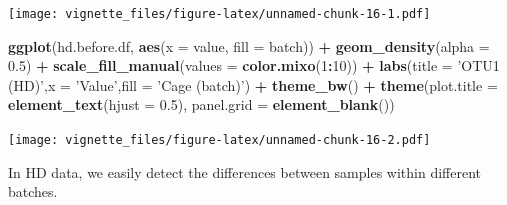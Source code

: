 \documentclass[]{book}
\newenvironment{Shaded}{\begin{snugshade}}{\end{snugshade}}
\newcommand{\KeywordTok}[1]{\textcolor[rgb]{0.13,0.29,0.53}{\textbf{#1}}}
\newcommand{\DataTypeTok}[1]{\textcolor[rgb]{0.13,0.29,0.53}{#1}}
\newcommand{\DecValTok}[1]{\textcolor[rgb]{0.00,0.00,0.81}{#1}}
\newcommand{\FloatTok}[1]{\textcolor[rgb]{0.00,0.00,0.81}{#1}}
\newcommand{\StringTok}[1]{\textcolor[rgb]{0.31,0.60,0.02}{#1}}
\newcommand{\CommentTok}[1]{\textcolor[rgb]{0.56,0.35,0.01}{\textit{#1}}}
\newcommand{\OperatorTok}[1]{\textcolor[rgb]{0.81,0.36,0.00}{\textbf{#1}}}
\newcommand{\NormalTok}[1]{#1}
\begin{document}
\begin{Shaded}
\end{Shaded}

\texttt{[image: vignette\_files/figure-latex/unnamed-chunk-16-1.pdf]}

\begin{Shaded}
\begin{Highlighting}[]
\KeywordTok{ggplot}\NormalTok{(hd.before.df, }\KeywordTok{aes}\NormalTok{(}\DataTypeTok{x =}\NormalTok{ value, }\DataTypeTok{fill =}\NormalTok{ batch)) }\OperatorTok{+}\StringTok{ }
\StringTok{  }\KeywordTok{geom_density}\NormalTok{(}\DataTypeTok{alpha =} \FloatTok{0.5}\NormalTok{) }\OperatorTok{+}\StringTok{ }\KeywordTok{scale_fill_manual}\NormalTok{(}\DataTypeTok{values =} \KeywordTok{color.mixo}\NormalTok{(}\DecValTok{1}\OperatorTok{:}\DecValTok{10}\NormalTok{)) }\OperatorTok{+}\StringTok{ }
\StringTok{  }\KeywordTok{labs}\NormalTok{(}\DataTypeTok{title =} \StringTok{'OTU1 (HD)'}\NormalTok{,}\DataTypeTok{x =} \StringTok{'Value'}\NormalTok{,}\DataTypeTok{fill =} \StringTok{'Cage (batch)'}\NormalTok{) }\OperatorTok{+}\StringTok{ }
\StringTok{  }\KeywordTok{theme_bw}\NormalTok{() }\OperatorTok{+}\StringTok{ }\KeywordTok{theme}\NormalTok{(}\DataTypeTok{plot.title =} \KeywordTok{element_text}\NormalTok{(}\DataTypeTok{hjust =} \FloatTok{0.5}\NormalTok{), }
                     \DataTypeTok{panel.grid =} \KeywordTok{element_blank}\NormalTok{())}
\end{Highlighting}
\end{Shaded}

\texttt{[image: vignette\_files/figure-latex/unnamed-chunk-16-2.pdf]}

In HD data, we easily detect the differences between samples within
different batches.
\end{document}
